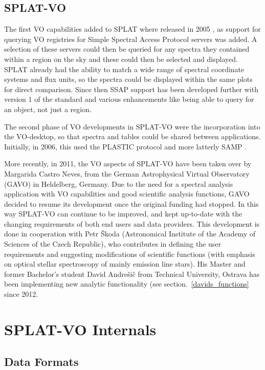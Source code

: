 \documentclass[final,authoryear,5p,times,twocolumn]{elsarticle}
\begin{document}
\subsection{SPLAT-VO}

The first VO capabilities added to SPLAT where released in 2005
\citep{2005ASPC..347...22D}, as support for querying VO registries for
Simple Spectral Access Protocol servers was added. A selection of
these servers could then be queried for any spectra they contained
within a region on the sky and these could then be selected and
displayed. SPLAT already had the ability to match a wide range of
spectral coordinate systems and flux units, so the spectra could be
displayed within the same plots for direct comparison. Since then SSAP
support has been developed further with version 1 of the standard and
various enhancements like being able to query for an object, not just
a region.

The second phase of VO developments in SPLAT-VO were the incorporation
into the VO-desktop, so that spectra and tables could be shared
between applications.  Initially, in 2006, this used the PLASTIC
\citep{2007ASPC..376..511T} protocol and more latterly SAMP
\citep{2012ASPC..461..279T}.

More recently, in 2011, the VO aspects of SPLAT-VO have been taken over by Margarida
Castro Neves, from the German Astrophysical Virtual Observatory (GAVO) in
Heldelberg, Germany.  Due to the need for a spectral analysis application with
VO capabilities and good scientific analysis functions, GAVO  decided to resume
its development once the original funding had stopped. In this way SPLAT-VO can
continue to be improved, and kept up-to-date with the changing requirements of
both end users and data providers.  This development  is done in cooperation
with Petr \v{S}koda (Astronomical Institute of the Academy of Sciences of the
Czech Republic), who contributes in defining the user requirements and
suggesting modifications of scientific functions (with emphasis on optical
stellar spectroscopy of mainly  emission line stars).  His Master and former
Bachelor's student David Andre\v{s}i\v{c} from Technical University, Ostrava has been
implementing new analytic functionality (see section.~\ref{davids_functions} since 2012.

\section{SPLAT-VO Internals}

\subsection{Data Formats}
\end{document}
